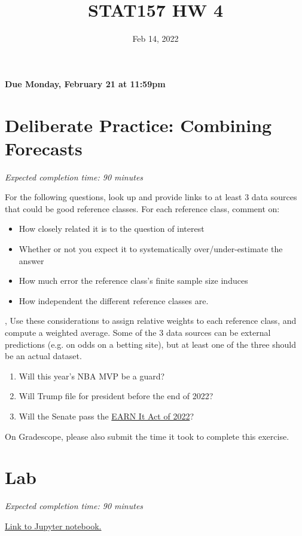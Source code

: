 \documentclass[11pt]{article}
\title{STAT157 HW 4}
\date{Feb 14, 2022}
\begin{document}
\maketitle

\hfill \textbf{Due Monday, February 21 at 11:59pm}

\section*{Deliberate Practice: Combining Forecasts}

\emph{Expected completion time: 90 minutes}


For the following questions, look up and provide links to at least 3 data sources that could be good reference classes. For each reference class, comment on: 
\begin{itemize}
	\item How closely related it is to the question of interest
	\item Whether or not you expect it to systematically over/under-estimate the answer
	\item How much error the reference class's finite sample size induces
	\item How independent the different reference classes are.
\end{itemize}, 
Use these considerations to assign relative weights to each reference class, and compute a weighted average. Some of the 3 data sources can be external predictions (e.g. on odds on a betting site), but at least one of the three should be an actual dataset.

\begin{enumerate}
	\item Will this year's NBA MVP be a guard?
	\item Will Trump file for president before the end of 2022?
	\item Will the Senate pass the \href{https://www.congress.gov/bill/117th-congress/senate-bill/3538}{EARN It Act of 2022}?
\end{enumerate}

On Gradescope, please also submit the time it took to complete this exercise.

\section*{Lab}

\emph{Expected completion time: 90 minutes}

\href{https://bit.ly/34T4SlQ}{Link to Jupyter notebook.}
\end{document}
